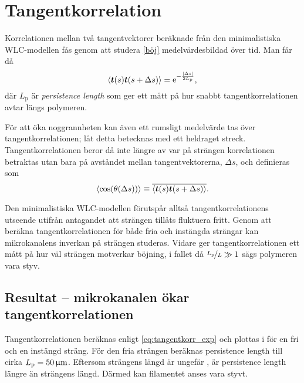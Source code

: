 \section{Tangentkorrelation}

Korrelationen mellan två tangentvektorer beräknade från den minimalistiska WLC-modellen fås genom att studera \eqref{böj} medelvärdesbildad över tid. Man får då \cite{Landau1958}
\begin{equation} \label{eq:tangentkorr_exp}
\ev{\mathbf{t}(s)\mathbf{t}(s+\Delta s)}=\ee^{-\frac{\abs{\Delta s}}{2L_\text{p}}},
\end{equation}
där $L_\text{p}$ är \emph{persistence length} som ger ett mått på hur snabbt tangentkorrelationen avtar längs polymeren. 

För att öka noggrannheten kan även ett rumsligt medelvärde tas över tangentkorrelationen; låt detta betecknas med ett heldraget streck. Tangentkorrelationen beror då inte längre av var på strängen korrelationen betraktas utan bara på avståndet mellan tangentvektorerna, $\Delta s$, och definieras som
\begin{equation}
\label{tangkorr}
    \ev{\cos(\theta(\Delta s))}\equiv\overline{\ev{\mathbf{t}(s)\mathbf{t}(s+\Delta s)}}.
\end{equation}

Den minimalistiska WLC-modellen förutspår alltså tangentkorrelationens utseende utifrån antagandet att strängen tillåts fluktuera fritt. Genom att beräkna tangentkorrelationen för både fria och instängda strängar kan mikrokanalens inverkan på strängen studeras. Vidare ger tangentkorrelationen ett mått på hur väl strängen motverkar böjning, i fallet då $\nicefrac{L_\text{p}}{L}\gg1$ sägs polymeren vara styv. 



\subsection{Resultat -- mikrokanalen ökar tangentkorrelationen}

Tangentkorrelationen beräknas enligt \eqref{eq:tangentkorr_exp} och plottas i  för en fri och en instängd sträng. För den fria strängen beräknas persistence length till cirka $L_\text{p}=\unit[50]{\micro{m}}$. Eftersom strängens längd är ungefär \unit[35]{}, är persistence length längre än strängens längd. Därmed kan filamentet anses vara styvt.


